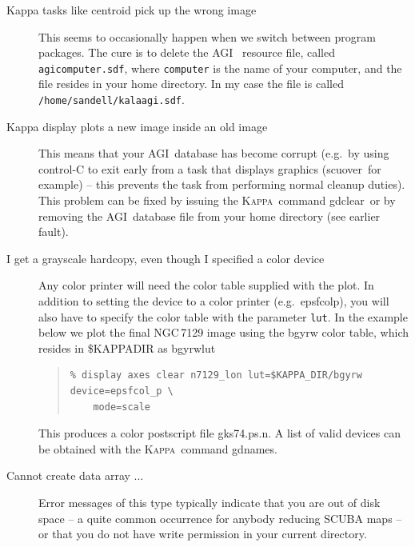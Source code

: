 \documentclass[twoside,11pt]{article}
\newenvironment{myquote}{\begin{quote}\begin{small}}{\end{small}\end{quote}}
\newcommand{\Kappa}{\xref{\textsc{Kappa}}{sun95}{}}
\newcommand{\agi}{\xref{AGI}{sun48}{}}
\newcommand{\task}[1]{\textsf{#1}}
\newcommand{\param}[1]{\texttt{#1}}
\newcommand{\scuover}{\xref{\task{scuover}}{sun216}{SCUOVER}}
\newcommand{\gdnames}{\xref{\task{gdnames}}{sun95}{GDNAMES}}
\newcommand{\gdclear}{\xref{\task{gdclear}}{sun95}{GDCLEAR}}
\newcommand{\xref}[3]{#1}
\renewcommand{\_}{\texttt{\symbol{95}}}
\begin{document}
\begin{description}
\item[Kappa tasks like \task{centroid} pick up the wrong image]\mbox{}

This seems to occasionally happen when we switch between program
packages. The cure is to delete the \agi\ \cite{agi} resource file,
called \texttt{agi\_computer.sdf}, where \texttt{computer} is the name
of your computer, and the file resides in your home directory. In my
case the file is called \texttt{/home/sandell/kala\_agi.sdf}.

\item[Kappa \task{display} plots a new image inside an old
image]\mbox{}

This means that your \agi\ database has become corrupt (e.g.\ by using
control-C to exit early from a task that displays graphics (\scuover\
for
example) -- this prevents the task from performing normal cleanup
duties). This problem can be fixed by issuing the \Kappa\ command
\gdclear\ or
by removing the \agi\ database file from your home directory (see
earlier
fault).

\item[I get a grayscale hardcopy, even though I specified a color
device]\mbox{}

Any color printer will need the color table supplied with the plot. In
addition to setting the device to a color printer (e.g.\ epsfcol\_p),
you will
also have to specify the color table with the parameter \param{lut}.
In the
example below we plot the final NGC\,7129 image using the bgyrw color
table,
which resides in \$KAPPA\_DIR as bgyrw\_lut

\begin{myquote} \begin{verbatim}
% display axes clear n7129_lon lut=$KAPPA_DIR/bgyrw device=epsfcol_p \
    mode=scale
\end{verbatim} \end{myquote}

This produces a color postscript file gks74.ps.n. A list of valid
devices
can be obtained with the \Kappa\ command \gdnames.


\item[Cannot create data array ...]\mbox{}

Error messages of this type typically indicate that you are out of
disk space -- a quite common occurrence for anybody reducing SCUBA
maps --
or that you do not have write permission in your current directory.

\end{description}
\end{document}
